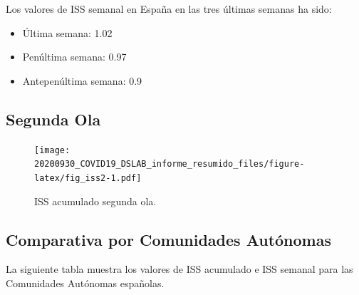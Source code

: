 \documentclass[
  11pt,
]{article}
\providecommand{\tightlist}{%
  \setlength{\itemsep}{0pt}\setlength{\parskip}{0pt}}
\begin{document}
Los valores de ISS semanal en España en las tres últimas semanas ha
sido:

\begin{itemize}
\tightlist
\item
  Última semana: 1.02
\item
  Penúltima semana: 0.97
\item
  Antepenúltima semana: 0.9
\end{itemize}

\hypertarget{segunda-ola}{%
\subsection{Segunda Ola}\label{segunda-ola}}

\begin{figure}
\centering
\texttt{[image: 20200930\_COVID19\_DSLAB\_informe\_resumido\_files/figure-latex/fig\_iss2-1.pdf]}
\caption{\label{fig:fig_iss2} ISS acumulado segunda ola.}
\end{figure}

\clearpage

\hypertarget{comparativa-por-comunidades-autuxf3nomas}{%
\subsection{Comparativa por Comunidades
Autónomas}\label{comparativa-por-comunidades-autuxf3nomas}}

La siguiente tabla muestra los valores de ISS acumulado e ISS semanal
para las Comunidades Autónomas españolas. \vspace{0.2cm}
\end{document}
